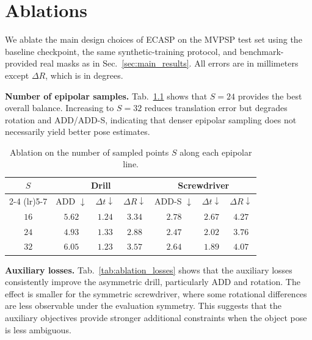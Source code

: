 \chapter{Ablations}
\label{sec:ablations}
We ablate the main design choices of ECASP on the MVPSP test set using the baseline checkpoint, the same synthetic-training protocol, and benchmark-provided real masks as in Sec.~\ref{sec:main_results}.
All errors are in millimeters except \(\Delta R\), which is in degrees.

\noindent\textbf{Number of epipolar samples.}
Tab.~\ref{tab:ablation_num_epipolar_samples} shows that \(S=24\) provides the best overall balance.
Increasing to \(S=32\) reduces translation error but degrades rotation and ADD/ADD-S, indicating that denser epipolar sampling does not necessarily yield better pose estimates.

\begin{table}[H]
\centering
\caption{Ablation on the number of sampled points \(S\) along each epipolar line.}
\label{tab:ablation_num_epipolar_samples}
\small
\setlength{\tabcolsep}{4.5pt}
\begin{tabular*}{\linewidth}{@{\extracolsep{\fill}}ccccccc@{}}
\toprule
\multirow{2}{*}{\(S\)}
&
\multicolumn{3}{c}{Drill}
&
\multicolumn{3}{c}{Screwdriver}
\\
\cmidrule(lr){2-4}
\cmidrule(lr){5-7}
&
ADD \(\downarrow\)
&
\(\Delta t \downarrow\)
&
\(\Delta R \downarrow\)
&
ADD-S \(\downarrow\)
&
\(\Delta t \downarrow\)
&
\(\Delta R \downarrow\)
\\
\midrule
\(16\)
& \(5.62\)
& \(1.24\)
& \(3.34\)
& \(2.78\)
& \(2.67\)
& \(4.27\)
\\
\(24\)
& \(\mathbf{4.93}\)
& \(1.33\)
& \(\mathbf{2.88}\)
& \(\mathbf{2.47}\)
& \(2.02\)
& \(\mathbf{3.76}\)
\\
\(32\)
& \(6.05\)
& \(\mathbf{1.23}\)
& \(3.57\)
& \(2.64\)
& \(\mathbf{1.89}\)
& \(4.07\)
\\
\bottomrule
\end{tabular*}
\end{table}

\noindent\textbf{Auxiliary losses.}
Tab.~\ref{tab:ablation_losses} shows that the auxiliary losses consistently improve the asymmetric drill, particularly ADD and rotation.
The effect is smaller for the symmetric screwdriver, where some rotational differences are less observable under the evaluation symmetry.
This suggests that the auxiliary objectives provide stronger additional constraints when the object pose is less ambiguous.



